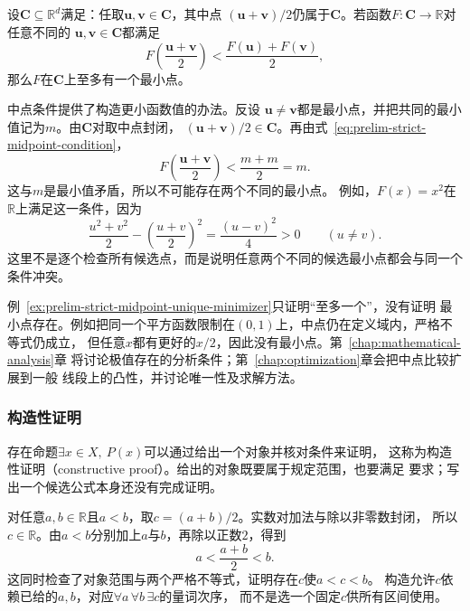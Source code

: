 \begin{example}[用反证法排除两个最小点]
\label{ex:prelim-strict-midpoint-unique-minimizer}
设$\bm{C}\subseteq\mathbb{R}^d$满足：任取$\bm{u},\bm{v}\in\bm{C}$，其中点
$(\bm{u}+\bm{v})/2$仍属于$\bm{C}$。若函数$F:\bm{C}\to\mathbb{R}$对任意不同的
$\bm{u},\bm{v}\in\bm{C}$都满足
\begin{equation}
  F\left(\frac{\bm{u}+\bm{v}}{2}\right)
  <
  \frac{F(\bm{u})+F(\bm{v})}{2},
  \label{eq:prelim-strict-midpoint-condition}
\end{equation}
那么$F$在$\bm{C}$上至多有一个最小点。

中点条件提供了构造更小函数值的办法。反设
$\bm{u}\neq\bm{v}$都是最小点，并把共同的最小值记为$m$。由$\bm{C}$对取中点封闭，
$(\bm{u}+\bm{v})/2\in\bm{C}$。再由式~\eqref{eq:prelim-strict-midpoint-condition}，
\[
  F\left(\frac{\bm{u}+\bm{v}}{2}\right)
  <
  \frac{m+m}{2}
  =m.
\]
这与$m$是最小值矛盾，所以不可能存在两个不同的最小点。
例如，$F(x)=x^2$在$\mathbb{R}$上满足这一条件，因为
\[
  \frac{u^2+v^2}{2}-\left(\frac{u+v}{2}\right)^2
  =\frac{(u-v)^2}{4}>0\qquad(u\neq v).
\]
这里不是逐个检查所有候选点，而是说明任意两个不同的候选最小点都会与同一个条件冲突。
\end{example}

例~\ref{ex:prelim-strict-midpoint-unique-minimizer}只证明“至多一个”，没有证明
最小点存在。例如把同一个平方函数限制在$(0,1)$上，中点仍在定义域内，严格不等式仍成立，
但任意$x$都有更好的$x/2$，因此没有最小点。第~\ref{chap:mathematical-analysis}章
将讨论极值存在的分析条件；第~\ref{chap:optimization}章会把中点比较扩展到一般
线段上的凸性，并讨论唯一性及求解方法。

\subsubsection{构造性证明}
\label{sec:prelim-constructive-proof}

存在命题$\exists x\in X,\ P(x)$可以通过给出一个对象并核对条件来证明，
这称为构造性证明（constructive proof）。给出的对象既要属于规定范围，也要满足
要求；写出一个候选公式本身还没有完成证明。

\begin{example}[构造两个实数之间的数]
\label{ex:prelim-constructive-midpoint}
对任意$a,b\in\mathbb{R}$且$a<b$，取$c=(a+b)/2$。实数对加法与除以非零数封闭，
所以$c\in\mathbb{R}$。由$a<b$分别加上$a$与$b$，再除以正数$2$，得到
\[
  a<\frac{a+b}{2}<b.
\]
这同时检查了对象范围与两个严格不等式，证明存在$c$使$a<c<b$。
构造允许$c$依赖已给的$a,b$，对应$\forall a\,\forall b\,\exists c$的量词次序，
而不是选一个固定$c$供所有区间使用。
\end{example}

